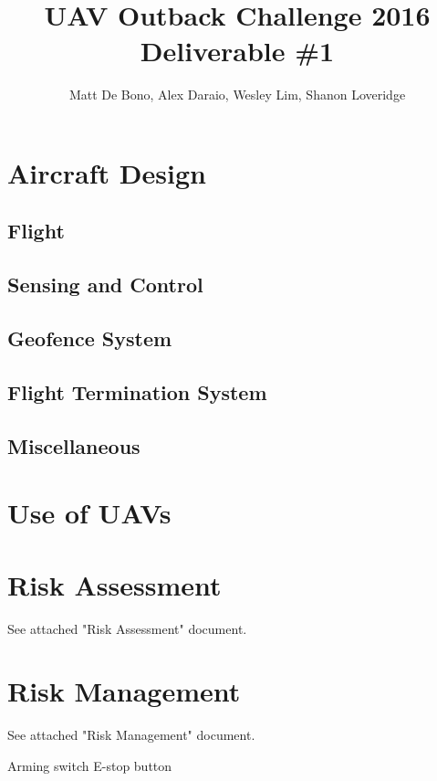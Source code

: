 \documentclass[]{article}
\title{UAV Outback Challenge 2016\\ \large Deliverable \#1\\}
\author{
	Matt De Bono,
	Alex Daraio,
	Wesley Lim,
	Shanon Loveridge}
\begin{document}
\maketitle

\section{Aircraft Design}
\subsection{Flight}


\subsection{Sensing and Control}


\subsection{Geofence System}


\subsection{Flight Termination System}


\subsection{Miscellaneous}


\section{Use of UAVs}


\section{Risk Assessment}
See attached "Risk Assessment" document.

\section{Risk Management}
See attached "Risk Management" document.

Arming switch
E-stop button
\end{document}
